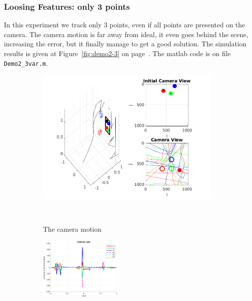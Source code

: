 \documentclass[a4paper,12pt]{article}
\begin{document}
\subsubsection{Loosing Features: only 3 points}
In this experiment we track only 3 points, even if all points are presented on the camera. The camera motion is far away from ideal, it even goes behind the scene, increasing the error, but it finally manage to get a good solution. 
The simulation results is given at Figure~\ref{fig:demo2-3} on page~\pageref{fig:demo2-3}. The matlab code is on file \texttt{Demo2\_3var.m}.
\begin{figure}[tb!]
                 \begin{subfigure}[b]{\textwidth}         
                \centering
                 \includegraphics[width=13cm]{../results/Demo2-3-simulation.png}
             \caption{The camera motion}
             \vspace~
                 \end{subfigure}
         \begin{subfigure}[b]{0.32\textwidth}
                \centering
                \includegraphics[height=1.2in]{../results/Demo2-3-control-law.png}
                 \end{subfigure}
         \begin{subfigure}[b]{0.2\textwidth}

\end{subfigure}
\end{figure}
\end{document}
